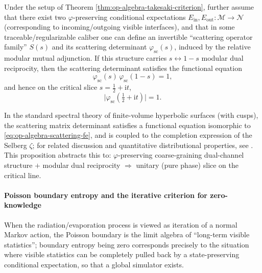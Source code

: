 \begin{proposition}\label{prop:op-algebra-modular-scattering-phase}
Under the setup of Theorem \ref{thm:op-algebra-takesaki-criterion}, further assume that there exist two \(\varphi\)-preserving conditional expectations
\(
E_{\mathrm{in}},E_{\mathrm{out}}:\mathcal{M}\to\mathcal{N}
\)
(corresponding to incoming/outgoing visible interfaces), and that in some traceable/regularizable caliber one can define an invertible ``scattering operator family'' \(S(s)\) and its scattering determinant \(\varphi_{\mathrm{sc}}(s)\), induced by the relative modular mutual adjunction.
If this structure carries \(s\leftrightarrow 1-s\) modular dual reciprocity, then the scattering determinant satisfies the functional equation
\begin{equation}\label{eq:op-algebra-scattering-fe}
\boxed{\;\varphi_{\mathrm{sc}}(s)\,\varphi_{\mathrm{sc}}(1-s)=1,\;}
\end{equation}
and hence on the critical slice \(s=\tfrac12+\mathrm{i}t\),
\begin{equation}\label{eq:op-algebra-scattering-unit-modulus}
\boxed{\;\bigl|\varphi_{\mathrm{sc}}(\tfrac12+\mathrm{i}t)\bigr|=1.\;}
\end{equation}
\end{proposition}

\begin{remark}\label{rem:op-algebra-scattering-selberg-analogy}
In the standard spectral theory of finite-volume hyperbolic surfaces (with cusps), the scattering matrix determinant satisfies a functional equation isomorphic to \eqref{eq:op-algebra-scattering-fe},
and is coupled to the completion expression of the Selberg \(\zeta\); for related discussion and quantitative distributional properties, see \cite{GarunkstisSimenas2017SelbergAValues}.
This proposition abstracts this to: \(\varphi\)-preserving coarse-graining dual-channel structure \(+\) modular dual reciprocity \(\Rightarrow\) unitary (pure phase) slice on the critical line.
\end{remark}

\paragraph{Poisson boundary entropy and the iterative criterion for zero-knowledge}
When the radiation/evaporation process is viewed as iteration of a normal Markov action, the Poisson boundary is the limit algebra of ``long-term visible statistics'';
boundary entropy being zero corresponds precisely to the situation where visible statistics can be completely pulled back by a state-preserving conditional expectation, so that a global simulator exists.

